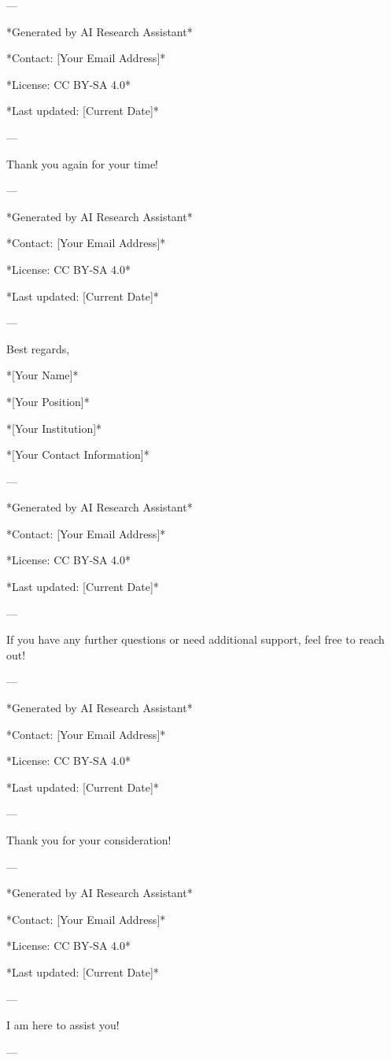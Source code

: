 --- 

*Generated by AI Research Assistant* 

*Contact: [Your Email Address]* 

*License: CC BY-SA 4.0* 

*Last updated: [Current Date]* 

--- 

Thank you again for your time! 

--- 

*Generated by AI Research Assistant* 

*Contact: [Your Email Address]* 

*License: CC BY-SA 4.0* 

*Last updated: [Current Date]* 

--- 

Best regards, 

*[Your Name]* 

*[Your Position]* 

*[Your Institution]* 

*[Your Contact Information]* 

--- 

*Generated by AI Research Assistant* 

*Contact: [Your Email Address]* 

*License: CC BY-SA 4.0* 

*Last updated: [Current Date]* 

--- 

If you have any further questions or need additional support, feel free to reach out! 

--- 

*Generated by AI Research Assistant* 

*Contact: [Your Email Address]* 

*License: CC BY-SA 4.0* 

*Last updated: [Current Date]* 

--- 

Thank you for your consideration! 

--- 

*Generated by AI Research Assistant* 

*Contact: [Your Email Address]* 

*License: CC BY-SA 4.0* 

*Last updated: [Current Date]* 

--- 

I am here to assist you! 

--- 

